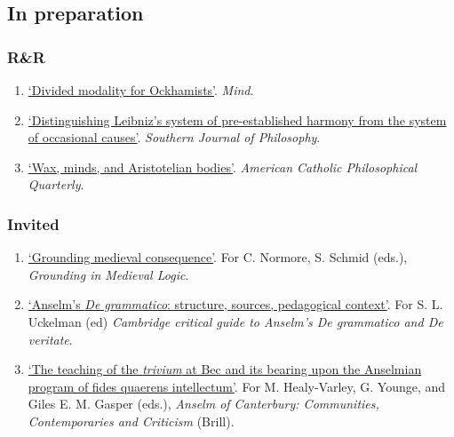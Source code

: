 \subsection{In preparation}
\subsubsection{R\&R}
\begin{enumerate}
	\setcounter{enumi}{\value{publicationCounter}}	%
	\item \datedsubsectionnarrow{}
	{}
	{
		\href{}{`Divided modality for Ockhamists'}. \emph{Mind}.}
	{}
	\item \datedsubsectionnarrow{}
{}
{
	\href{}{`Distinguishing Leibniz's system of pre-established harmony from the system of occasional causes'}. \emph{Southern Journal of Philosophy}.}
{}
	\item \datedsubsectionnarrow{}
{}
{
	\href{}{`Wax, minds, and Aristotelian bodies'}. \emph{American Catholic Philosophical Quarterly}.}
{}
	\setcounter{publicationCounter}{\value{enumi}}	%
\end{enumerate}
\subsubsection{Invited}
\begin{enumerate}
	\setcounter{enumi}{\value{publicationCounter}}	%
	\item \datedsubsectionnarrow{}
	{}
	{
		\href{}{`Grounding medieval consequence'}. For C. Normore, S. Schmid (eds.), \emph{Grounding in Medieval Logic}.}
	{}
	\item \datedsubsectionnarrow{}
	{}
	{
		\href{}{`Anselm's \emph{De grammatico}: structure, sources, pedagogical context'}. For S. L. Uckelman (ed) \emph{Cambridge critical guide to Anselm's De grammatico and De veritate}.}
	{}
	\item \datedsubsectionnarrow{}
	{}
	{
		\href{}{`The teaching of the \emph{trivium} at Bec and its bearing upon the Anselmian program of {fides quaerens intellectum}'}. For M. Healy-Varley, G. Younge, and Giles E. M. Gasper (eds.), \emph{Anselm of Canterbury: Communities, Contemporaries and Criticism} (Brill).}
	{}
	\setcounter{publicationCounter}{\value{enumi}}	%
\end{enumerate}
